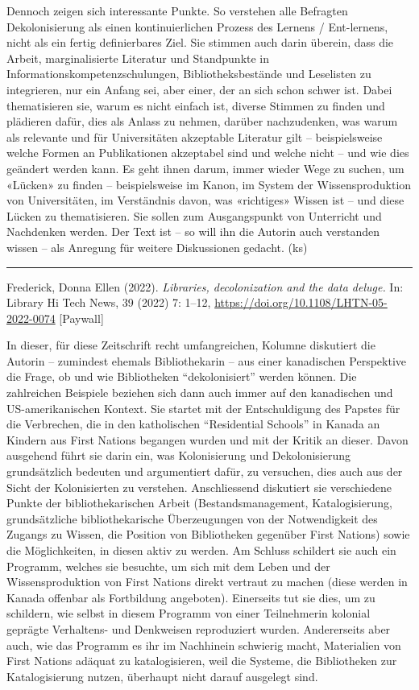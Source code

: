 \documentclass[a4paper,
fontsize=11pt,
oneside,
numbers=noperiodatend,
parskip=half-,
bibliography=totoc,
final
]{scrartcl}
\begin{document}
Dennoch zeigen sich interessante Punkte. So verstehen alle Befragten
Dekolonisierung als einen kontinuierlichen Prozess des Lernens /
Ent-lernens, nicht als ein fertig definierbares Ziel. Sie stimmen auch
darin überein, dass die Arbeit, marginalisierte Literatur und
Standpunkte in Informationskompetenzschulungen, Bibliotheksbestände und
Leselisten zu integrieren, nur ein Anfang sei, aber einer, der an sich
schon schwer ist. Dabei thematisieren sie, warum es nicht einfach ist,
diverse Stimmen zu finden und plädieren dafür, dies als Anlass zu
nehmen, darüber nachzudenken, was warum als relevante und für
Universitäten akzeptable Literatur gilt -- beispielsweise welche Formen
an Publikationen akzeptabel sind und welche nicht -- und wie dies
geändert werden kann. Es geht ihnen darum, immer wieder Wege zu suchen,
um «Lücken» zu finden -- beispielsweise im Kanon, im System der
Wissensproduktion von Universitäten, im Verständnis davon, was
«richtiges» Wissen ist -- und diese Lücken zu thematisieren. Sie sollen
zum Ausgangspunkt von Unterricht und Nachdenken werden. Der Text ist --
so will ihn die Autorin auch verstanden wissen -- als Anregung für
weitere Diskussionen gedacht. (ks)

\begin{center}\rule{0.5\linewidth}{0.5pt}\end{center}

Frederick, Donna Ellen (2022). \emph{Libraries, decolonization and the
data deluge.} In: Library Hi Tech News, 39 (2022) 7: 1--12,
\url{https://doi.org/10.1108/LHTN-05-2022-0074} {[}Paywall{]}

In dieser, für diese Zeitschrift recht umfangreichen, Kolumne diskutiert
die Autorin -- zumindest ehemals Bibliothekarin -- aus einer kanadischen
Perspektive die Frage, ob und wie Bibliotheken \enquote{dekolonisiert}
werden können. Die zahlreichen Beispiele beziehen sich dann auch immer
auf den kanadischen und US-amerikanischen Kontext. Sie startet mit der
Entschuldigung des Papstes für die Verbrechen, die in den katholischen
\enquote{Residential Schools} in Kanada an Kindern aus First Nations
begangen wurden und mit der Kritik an dieser. Davon ausgehend führt sie
darin ein, was Kolonisierung und Dekolonisierung grundsätzlich bedeuten
und argumentiert dafür, zu versuchen, dies auch aus der Sicht der
Kolonisierten zu verstehen. Anschliessend diskutiert sie verschiedene
Punkte der bibliothekarischen Arbeit (Bestandsmanagement,
Katalogisierung, grundsätzliche bibliothekarische Überzeugungen von der
Notwendigkeit des Zugangs zu Wissen, die Position von Bibliotheken
gegenüber First Nations) sowie die Möglichkeiten, in diesen aktiv zu
werden. Am Schluss schildert sie auch ein Programm, welches sie
besuchte, um sich mit dem Leben und der Wissensproduktion von First
Nations direkt vertraut zu machen (diese werden in Kanada offenbar als
Fortbildung angeboten). Einerseits tut sie dies, um zu schildern, wie
selbst in diesem Programm von einer Teilnehmerin kolonial geprägte
Verhaltens- und Denkweisen reproduziert wurden. Andererseits aber auch,
wie das Programm es ihr im Nachhinein schwierig macht, Materialien von
First Nations adäquat zu katalogisieren, weil die Systeme, die
Bibliotheken zur Katalogisierung nutzen, überhaupt nicht darauf
ausgelegt sind.
\end{document}
